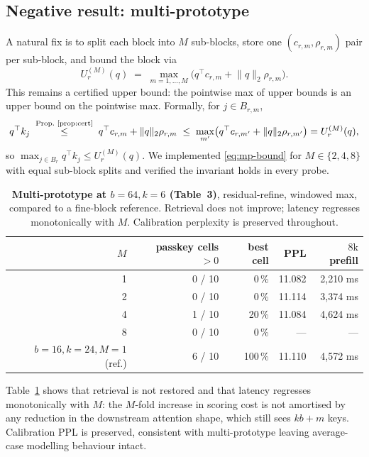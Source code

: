 \documentclass[11pt]{article}
\theoremstyle{plain}
\theoremstyle{definition}
\newcommand{\ur}{U_r}
\newcommand{\normq}{\lVert q \rVert_2}
\begin{document}
\subsection{Negative result: multi-prototype}
\label{sec:multiproto}

A natural fix is to split each block into $M$ sub-blocks, store one
$(c_{r,m}, \rho_{r,m})$ pair per sub-block, and bound the block via
\begin{equation}
\ur^{(M)}(q) \;=\; \max_{m=1,\dots,M} \bigl(q^{\top} c_{r,m} + \normq \rho_{r,m}\bigr). \label{eq:mp-bound}
\end{equation}
This remains a certified upper bound: the pointwise max of upper bounds
is an upper bound on the pointwise max. Formally, for $j \in B_{r,m}$,
\[
q^{\top} k_j \;\overset{\text{Prop.~\ref{prop:cert}}}{\le}\; q^{\top} c_{r,m} + \normq \rho_{r,m} \;\le\; \max_{m'} \bigl(q^{\top} c_{r,m'} + \normq \rho_{r,m'}\bigr) = \ur^{(M)}(q),
\]
so $\max_{j \in B_r} q^{\top} k_j \le \ur^{(M)}(q)$.
We implemented \eqref{eq:mp-bound} for $M \in \{2, 4, 8\}$ with equal
sub-block splits and verified the invariant holds in every probe.

\begin{table}[t]
\centering
\small
\begin{tabular}{r r r r r}
\toprule
$M$ & passkey cells $>0$ & best cell & PPL & $8\mathrm{k}$ prefill \\
\midrule
1 & 0 / 10  &  0\,\%   & 11.082 & 2{,}210 ms \\
2 & 0 / 10  &  0\,\%   & 11.114 & 3{,}374 ms \\
4 & 1 / 10  & 20\,\%   & 11.084 & 4{,}624 ms \\
8 & 0 / 10  &  0\,\%   &  ---    &   ---     \\
\midrule
$b = 16, k = 24, M = 1$ (ref.) & 6 / 10 & 100\,\% & 11.110 & 4{,}572 ms \\
\bottomrule
\end{tabular}
\caption{\textbf{Multi-prototype at $b = 64, k = 6$ (Table~3)}, residual-refine, windowed max, compared to a fine-block reference. Retrieval does not improve; latency regresses monotonically with $M$. Calibration perplexity is preserved throughout.}
\label{tab:multiproto}
\end{table}

Table~\ref{tab:multiproto} shows that retrieval is not restored and that
latency regresses monotonically with $M$: the $M$-fold increase in
scoring cost is not amortised by any reduction in the downstream
attention shape, which still sees $kb + m$ keys. Calibration PPL is
preserved, consistent with multi-prototype leaving average-case modelling
behaviour intact.
\end{document}
